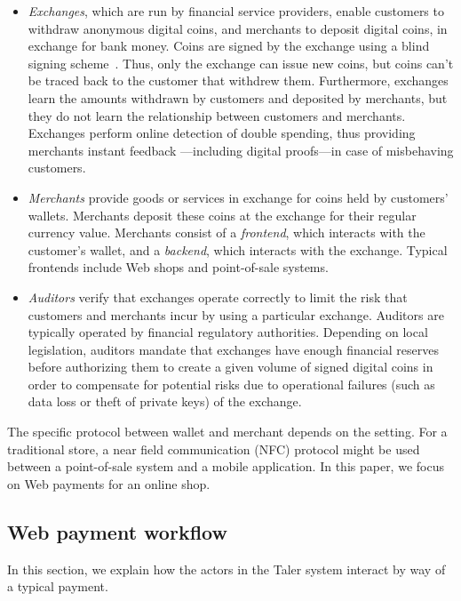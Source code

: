 \documentclass{llncs}
\begin{document}
\begin{itemize}
\item
{\em Exchanges}, which are run by financial service providers, enable
customers to withdraw anonymous digital coins,
and merchants to deposit digital coins, in exchange for
bank money.  Coins are signed by the exchange using
a blind signing scheme~\cite{chaum1983blind}.  Thus, only
the exchange can issue new coins, but coins can't be traced back
to the customer that withdrew them.
Furthermore, exchanges learn the amounts withdrawn by customers
and deposited by merchants, but they do not learn the relationship
between customers and merchants.  Exchanges perform online detection
of double spending, thus providing merchants instant feedback
---including digital proofs---in case of misbehaving customers.

\item
{\em Merchants} provide goods or services in exchange for coins held
by customers' wallets.  Merchants deposit these coins at the
exchange for their regular currency value.  Merchants consist of a
{\em frontend}, which interacts with the customer's wallet, and a {\em
backend}, which interacts with the exchange.  Typical frontends include
Web shops and point-of-sale systems.

\item
{\em Auditors} verify that exchanges operate correctly to limit the risk
that customers and merchants incur by using a particular exchange.
Auditors are typically operated by financial regulatory authorities.
Depending on local legislation, auditors mandate that exchanges
have enough financial reserves before authorizing them to create a given
volume of signed digital coins in order to compensate for potential risks due to
operational failures (such as data loss or theft of private keys) of the exchange.
\end{itemize}


The specific protocol between wallet and merchant depends on the
setting.  For a traditional store, a near field communication (NFC) protocol might be used
between a point-of-sale system and a mobile application.  In this
paper, we focus on Web payments for an online shop.


\subsection{Web payment workflow}

In this section, we explain how the actors in the Taler system
interact by way of a typical payment.
\end{document}
